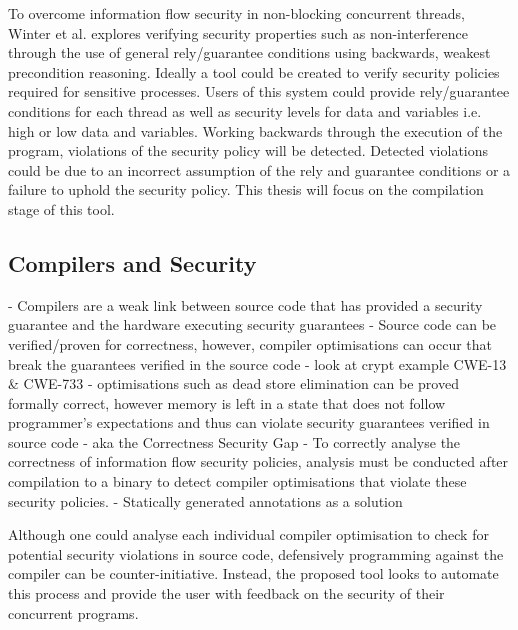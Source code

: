 \documentclass[twocolumn]{article}
\begin{document}
To overcome information flow security in non-blocking concurrent threads, Winter et al. \cite{winter2020information} explores verifying security properties such as non-interference through the use of general rely/guarantee conditions using backwards, weakest precondition reasoning. Ideally a tool could be created to verify security policies required for sensitive processes. Users of this system could provide rely/guarantee conditions for each thread as well as security levels for data and variables i.e. high or low data and variables. Working backwards through the execution of the program, violations of the security policy will be detected. Detected violations could be due to an incorrect assumption of the rely and guarantee conditions or a failure to uphold the security policy. This thesis will focus on the compilation stage of this tool.

\subsection{Compilers and Security}

- Compilers are a weak link between source code that has provided a security guarantee and the hardware executing security guarantees
- Source code can be verified/proven for correctness, however, compiler optimisations can occur that break the guarantees verified in the source code - look at crypt example CWE-13 \&{} CWE-733
- optimisations such as dead store elimination can be proved formally correct, however memory is left in a state that does not follow programmer's expectations and thus can violate security guarantees verified in source code
- aka the Correctness Security Gap
- To correctly analyse the correctness of information flow security policies, analysis must be conducted after compilation to a binary to detect compiler optimisations that violate these security policies.
- Statically generated annotations as a solution

Although one could analyse each individual compiler optimisation to check for potential security violations in source code, defensively programming against the compiler can be counter-initiative. Instead, the proposed tool looks to automate this process and provide the user with feedback on the security of their concurrent programs. 
\end{document}
